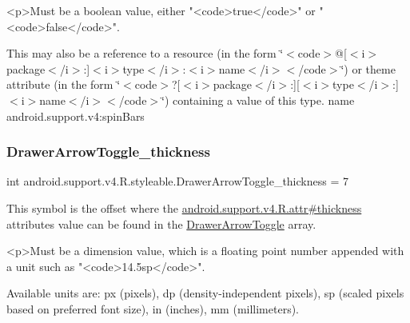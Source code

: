 \begin{DoxyVerb}      <p>Must be a boolean value, either "<code>true</code>" or "<code>false</code>".
\end{DoxyVerb}
 

This may also be a reference to a resource (in the form \char`\"{}$<$code$>$@\mbox{[}$<$i$>$package$<$/i$>$\+:\mbox{]}$<$i$>$type$<$/i$>$\+:$<$i$>$name$<$/i$>$$<$/code$>$\char`\"{}) or theme attribute (in the form \char`\"{}$<$code$>$?\mbox{[}$<$i$>$package$<$/i$>$\+:\mbox{]}\mbox{[}$<$i$>$type$<$/i$>$\+:\mbox{]}$<$i$>$name$<$/i$>$$<$/code$>$\char`\"{}) containing a value of this type.  name android.\+support.\+v4\+:spin\+Bars \mbox{\label{classandroid_1_1support_1_1v4_1_1R_1_1styleable_a1be933a91500d201cebc19118e4160bf}} 
\subsubsection{\texorpdfstring{Drawer\+Arrow\+Toggle\+\_\+thickness}{DrawerArrowToggle\_thickness}}
{\footnotesize\ttfamily int android.\+support.\+v4.\+R.\+styleable.\+Drawer\+Arrow\+Toggle\+\_\+thickness = 7\hspace{0.3cm}{\ttfamily [static]}}

This symbol is the offset where the \hyperlink{classandroid_1_1support_1_1v4_1_1R_1_1attr_a30b3c9eb3da6af56431fd47ecc8ab38e}{android.\+support.\+v4.\+R.\+attr\#thickness} attribute\textquotesingle{}s value can be found in the \hyperlink{classandroid_1_1support_1_1v4_1_1R_1_1styleable_af08d693b5d7faf0f18822ffe29c6028c}{Drawer\+Arrow\+Toggle} array.

\begin{DoxyVerb}      <p>Must be a dimension value, which is a floating point number appended with a unit such as "<code>14.5sp</code>".
\end{DoxyVerb}
 Available units are\+: px (pixels), dp (density-\/independent pixels), sp (scaled pixels based on preferred font size), in (inches), mm (millimeters). 

